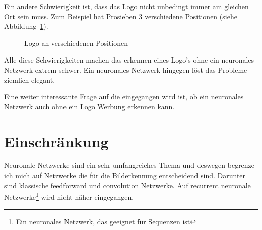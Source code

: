 \documentclass[12pt,a4paper]{report}
\begin{document}
Ein andere Schwierigkeit ist, dass das Logo nicht unbedingt immer am gleichen Ort sein muss.
Zum Beispiel hat Prosieben 3 verschiedene Positionen (siehe Abbildung~\ref{fig:logo3}).
\begin{figure}[h]%
    \centering
    \qquad
    \qquad
    \caption{Logo an verschiedenen Positionen}%
    \label{fig:logo3}%
\end{figure}
Alle diese Schwierigkeiten machen das erkennen eines Logo's ohne ein neuronales Netzwerk extrem schwer.
Ein neuronales Netzwerk hingegen löst das Probleme ziemlich elegant.

Eine weiter interessante Frage auf die eingegangen wird ist, ob ein neuronales Netzwerk auch ohne ein Logo Werbung erkennen kann.

\section{Einschränkung}
Neuronale Netzwerke sind ein sehr umfangreiches Thema und deswegen begrenze ich mich auf Netzwerke die für die Bilderkennung entscheidend sind.
Darunter sind klassische feedforward und convolution Netzwerke.
Auf recurrent neuronale Netzwerke\footnote{Ein neuronales Netzwerk, das geeignet für Sequenzen ist} wird nicht näher eingegangen.
\end{document}
